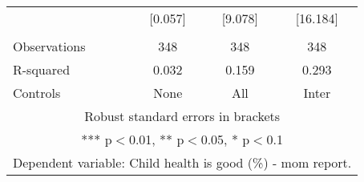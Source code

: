 \begin{tabular}{lccc}
 & [0.057] & [9.078] & [16.184] \\
 &  &  &  \\
Observations & 348 & 348 & 348 \\
R-squared & 0.032 & 0.159 & 0.293 \\
 Controls & None & All & Inter \\ \hline
\multicolumn{4}{c}{ Robust standard errors in brackets} \\
\multicolumn{4}{c}{ *** p$<$0.01, ** p$<$0.05, * p$<$0.1} \\
\multicolumn{4}{c}{ Dependent variable: Child health is good (\%) - mom report.} \\
\end{tabular}
